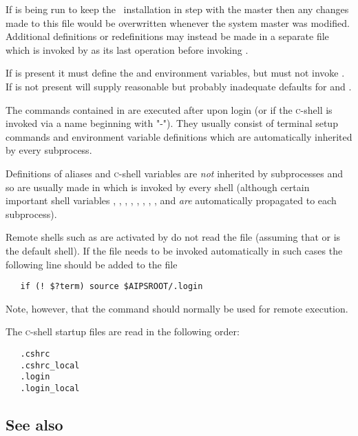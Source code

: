 If  is being run to keep the \aipspp\ installation in step with
the master then any changes made to this file would be overwritten whenever
the system master was modified.  Additional definitions or redefinitions may
instead be made in a separate  file which is invoked by
 as its last operation before invoking
.

If  is present it must define the  and
 environment variables, but must not invoke .
If  is not present  will supply reasonable
but probably inadequate defaults for  and .

The commands contained in  are executed after  upon
login (or if the \textsc{c}-shell is invoked via a name beginning with "-").
They usually consist of terminal setup commands and environment variable
definitions which are automatically inherited by every subprocess.

Definitions of aliases and \textsc{c}-shell variables are {\em not} inherited
by subprocesses and so are usually made in  which is invoked by
every shell (although certain important shell variables ,
, , , , ,
, , and  {\em are} automatically
propagated to each subprocess).

Remote shells such as are activated by  do not read the
 file (assuming that  or  is the
default shell).  If the  file needs to be invoked automatically
in such cases the following line should be added to the 
file

\begin{verbatim}
   if (! $?term) source $AIPSROOT/.login
\end{verbatim}

\noindent
Note, however, that the  command should normally be used for
remote execution.

The \textsc{c}-shell startup files are read in the following order:

\begin{verbatim}
   .cshrc
   .cshrc_local
   .login
   .login_local
\end{verbatim}

\subsection*{See also}

